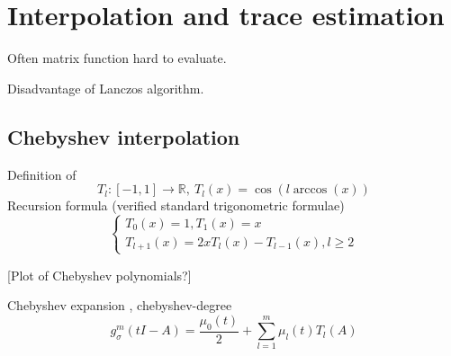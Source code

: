 \chapter{Interpolation and trace estimation}
\label{chp:2-chebyshev}

Often matrix function hard to evaluate.

Disadvantage of Lanczos algorithm.


\section{Chebyshev interpolation}
\label{sec:2-chebyshev-interpolation}

Definition of  \cite[Chapter~3]{trefethen2019chebyshev}
\begin{equation}
    T_l: [-1, 1] \to \mathbb{R},~T_l(x) = \cos(l \arccos(x))
    \label{equ:2-chebyshev-chebyshev-definition}
\end{equation}
Recursion formula (verified standard trigonometric formulae)
\begin{equation}
    \begin{cases}
        T_0(x) = 1, T_1(x) = x \\ T_{l+1}(x) = 2x T_l(x) - T_{l-1}(x), l \geq 2
    \end{cases}
    \label{equ:2-chebyshev-chebyshev-recursion}
\end{equation}

[Plot of Chebyshev polynomials?]

Chebyshev expansion \cite[Chapter~3]{trefethen2019chebyshev},
\gls{chebyshev-degree}
\begin{equation}
    g_{\sigma}^m(tI - A) = \frac{\mu_0(t)}{2} + \sum_{l=1}^m \mu_l(t) T_l(A)
    \label{equ:2-chebyshev-chebyshev-expansion}
\end{equation}

